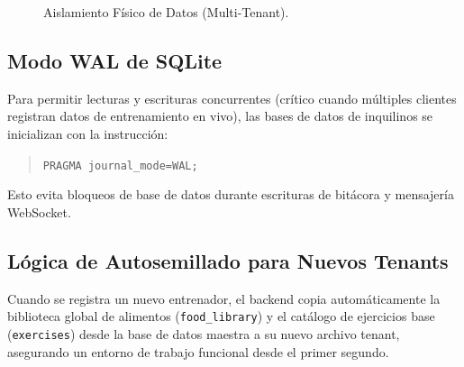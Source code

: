 \documentclass[11pt]{article}
\begin{document}
\begin{figure}[h]
\centering
{}
\caption{Aislamiento Físico de Datos (Multi-Tenant).}
\end{figure}

\subsection{Modo WAL de SQLite}
Para permitir lecturas y escrituras concurrentes (crítico cuando múltiples clientes registran datos de entrenamiento en vivo), las bases de datos de inquilinos se inicializan con la instrucción:
\begin{quote}\footnotesize
    \texttt{PRAGMA journal\_mode=WAL;}
\end{quote}
Esto evita bloqueos de base de datos durante escrituras de bitácora y mensajería WebSocket.

\subsection{Lógica de Autosemillado para Nuevos Tenants}
Cuando se registra un nuevo entrenador, el backend copia automáticamente la biblioteca global de alimentos (\texttt{food\_library}) y el catálogo de ejercicios base (\texttt{exercises}) desde la base de datos maestra a su nuevo archivo tenant, asegurando un entorno de trabajo funcional desde el primer segundo.
\end{document}
